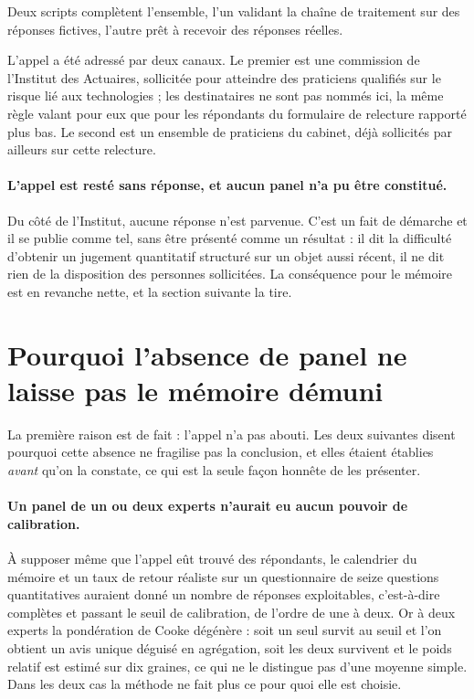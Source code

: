 Deux scripts complètent l'ensemble, l'un validant la chaîne de traitement sur des réponses
fictives, l'autre prêt à recevoir des réponses réelles.

L'appel a été adressé par deux canaux. Le premier est une commission de l'Institut des Actuaires,
sollicitée pour atteindre des praticiens qualifiés sur le risque lié aux technologies ; les
destinataires ne sont pas nommés ici, la même règle valant pour eux que pour les répondants du
formulaire de relecture rapporté plus bas. Le second est un ensemble de praticiens du cabinet,
déjà sollicités par ailleurs sur cette relecture.

\paragraph{L'appel est resté sans réponse, et aucun panel n'a pu être constitué.} Du côté de
l'Institut, aucune réponse n'est parvenue. C'est un fait de démarche et il se publie comme tel,
sans être présenté comme un résultat : il dit la difficulté d'obtenir un jugement quantitatif
structuré sur un objet aussi récent, il ne dit rien de la disposition des personnes sollicitées.
La conséquence pour le mémoire est en revanche nette, et la section suivante la tire.

\section{Pourquoi l'absence de panel ne laisse pas le mémoire démuni}

La première raison est de fait : l'appel n'a pas abouti. Les deux suivantes disent pourquoi cette
absence ne fragilise pas la conclusion, et elles étaient établies \emph{avant} qu'on la constate,
ce qui est la seule façon honnête de les présenter.

\paragraph{Un panel de un ou deux experts n'aurait eu aucun pouvoir de calibration.} À supposer
même que l'appel eût trouvé des répondants, le calendrier du mémoire et un taux de retour
réaliste sur un questionnaire de seize questions quantitatives auraient donné un nombre de
réponses exploitables, c'est-à-dire complètes et passant le seuil de calibration, de l'ordre de
une à deux. Or à deux experts la pondération de Cooke dégénère : soit un
seul survit au seuil et l'on obtient un avis unique déguisé en agrégation, soit les deux
survivent et le poids relatif est estimé sur dix graines, ce qui ne le distingue pas d'une
moyenne simple. Dans les deux cas la méthode ne fait plus ce pour quoi elle est choisie.

